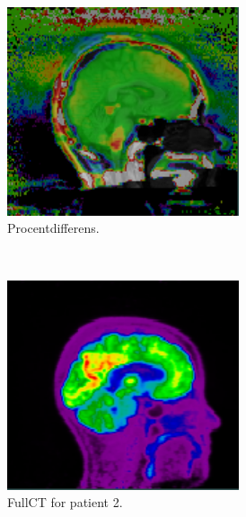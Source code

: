 \begin{figure}[H]
\begin{subfigure}{0.3\textwidth}
        \centering
        \includegraphics[width=0.75\textwidth]{colager/loocv_pet/loocv_010476_pet_pd.png}
        \caption{Procentdifferens.}
        \label{col:loocv_pet_pat1_pd}
    \end{subfigure}\\
    \begin{subfigure}{0.3\textwidth}
        \centering
        \includegraphics[width=0.75\textwidth]{colager/loocv_pet/loocv_010769_pet_ct.png}
        \caption{FullCT for patient 2.}
        \label{col:loocv_pet_pat2_ct}
    \end{subfigure}\hfill
    \begin{subfigure}{0.3\textwidth}
        \centering

\end{subfigure}
\end{figure}
